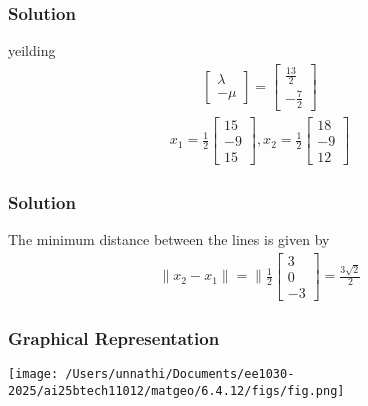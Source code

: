 \documentclass{beamer}
\begin{document}
 \begin{frame}
\frametitle{Solution}
 yeilding 
\begin{align}
    \begin{bmatrix}\lambda \\ -\mu\end{bmatrix} = \begin{bmatrix}\frac{13}{2} \\ -\frac{7}{2}\end{bmatrix}
\end{align}
\begin{align}
    \textbf{$x_1$} =\frac{1}{2} \begin{bmatrix}15 \\ -9 \\ 15\end{bmatrix} ,
        \textbf{$x_2$} =\frac{1}{2} \begin{bmatrix}18 \\ -9 \\ 12\end{bmatrix}
\end{align}
\end{frame}

 \begin{frame}
\frametitle{Solution}
The minimum distance between the lines is given by
\begin{align}
    \lVert \textbf{$x_2$} - \textbf{$x_1$} \rVert = \lVert \frac{1}{2}\begin{bmatrix}3 \\ 0 \\ -3\end{bmatrix}
     = \frac{3\sqrt{2}}{2}
\end{align}
\end{frame}

\begin{frame}

\frametitle{Graphical Representation}
\begin{center}
\texttt{[image: /Users/unnathi/Documents/ee1030-2025/ai25btech11012/matgeo/6.4.12/figs/fig.png]}
\end{center}
\end{frame}
\end{document}
